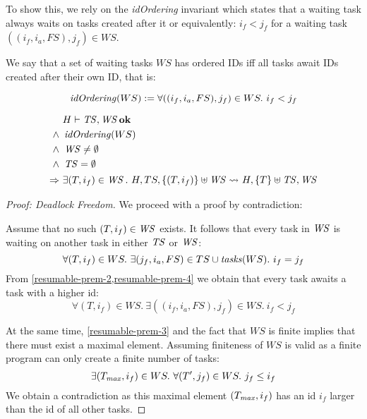 To show this, we rely on the \textit{idOrdering} invariant which states that a waiting task always waits on tasks created after it or equivalently: $i_f < j_f$ for a waiting task $((i_f, i_a, FS), j_f) \in WS$.
\begin{definition}[ID Ordering]
    We say that a set of waiting tasks $WS$ has ordered IDs iff all tasks await IDs created after their own ID, that is:

    \[\mathop{\mathit{idOrdering}}(WS) := \forall ((i_f, i_a, FS),j_f) \in WS.\ i_f < j_f\]
\end{definition}

\begin{lemma} \label{resumable-task}
\begin{alignat}{2}
&H \vdash \TS, \WS \bn{ok} \label{resumable-prem-1}\\
\wedge\ &\vn{idOrdering}(WS) \label{resumable-prem-2}\\
\wedge\ &\WS \neq \emptyset \label{resumable-prem-3}\\
\wedge\ &\TS = \emptyset \label{resumable-prem-4}\\
\Rightarrow\ &\exists (T, i_f) \in \WS.\ \reductasks{}[TS, \{(T,i_f)\} \uplus \WS]{T}* \label{resumable-concl}
\end{alignat}
\end{lemma}
\begin{proof}[Proof: Deadlock Freedom]
We proceed with a proof by contradiction:

Assume that no such $(T,i_f) \in \mathop{\mathit{WS}}$ exists. It follows that every task in $\mathop{\mathit{WS}}$ is waiting on another task in either $\mathop{\mathit{TS}}$ or $\mathop{\mathit{WS}}$:
\begin{equation}
    \forall (T,i_f) \in WS.\ \exists (j_f, i_a, FS) \in TS \cup \mathop{\mathit{tasks}}(WS).\ i_f = j_f
\end{equation}
From \cref{resumable-prem-2,resumable-prem-4} we obtain that every task awaits a task with a higher id:
\begin{equation}
    \forall (T,i_f) \in WS.\ \exists ((i_f,i_a,FS),j_f) \in WS.\ i_f < j_f
\end{equation}

At the same time, \cref{resumable-prem-3} and the fact that $WS$ is finite implies that there must exist a maximal element. Assuming finiteness of $WS$ is valid as a finite program can only create a finite number of tasks:
\begin{equation}
    \exists (T_{\mathop{\mathit{max}}},i_f) \in WS.\ \forall (T',j_f) \in WS.\ j_f \leq i_f
\end{equation}
We obtain a contradiction as this maximal element $(T_{\mathop{\mathit{max}}}, i_f)$ has an id $i_f$ larger than the id of all other tasks.
\end{proof}

